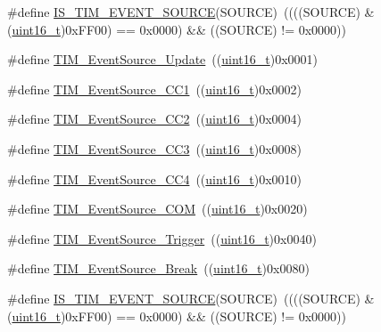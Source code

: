 \begin{DoxyCompactItemize}
\item 
\#define \hyperlink{group___t_i_m___event___source_ga4ac88c3e43c8250114ea81a6e052d58a}{I\+S\+\_\+\+T\+I\+M\+\_\+\+E\+V\+E\+N\+T\+\_\+\+S\+O\+U\+R\+CE}(S\+O\+U\+R\+CE)~((((S\+O\+U\+R\+CE) \& (\hyperlink{_p_e___types_8h_a1f1825b69244eb3ad2c7165ddc99c956}{uint16\+\_\+t})0x\+F\+F00) == 0x0000) \&\& ((\+S\+O\+U\+R\+C\+E) != 0x0000))
\item 
\#define \hyperlink{group___t_i_m___event___source_ga5bff72fbe94b1ae5a710e402c9868b23}{T\+I\+M\+\_\+\+Event\+Source\+\_\+\+Update}~((\hyperlink{_p_e___types_8h_a1f1825b69244eb3ad2c7165ddc99c956}{uint16\+\_\+t})0x0001)
\item 
\#define \hyperlink{group___t_i_m___event___source_gaa634c46d4ac521ad16e25be97b487e8a}{T\+I\+M\+\_\+\+Event\+Source\+\_\+\+C\+C1}~((\hyperlink{_p_e___types_8h_a1f1825b69244eb3ad2c7165ddc99c956}{uint16\+\_\+t})0x0002)
\item 
\#define \hyperlink{group___t_i_m___event___source_ga5e2082a09552acc9c7e9577f104ba15a}{T\+I\+M\+\_\+\+Event\+Source\+\_\+\+C\+C2}~((\hyperlink{_p_e___types_8h_a1f1825b69244eb3ad2c7165ddc99c956}{uint16\+\_\+t})0x0004)
\item 
\#define \hyperlink{group___t_i_m___event___source_gafeb8538e3b00d938e061e5051f83836b}{T\+I\+M\+\_\+\+Event\+Source\+\_\+\+C\+C3}~((\hyperlink{_p_e___types_8h_a1f1825b69244eb3ad2c7165ddc99c956}{uint16\+\_\+t})0x0008)
\item 
\#define \hyperlink{group___t_i_m___event___source_gab60e3190e6c09d2d067f2c689d614979}{T\+I\+M\+\_\+\+Event\+Source\+\_\+\+C\+C4}~((\hyperlink{_p_e___types_8h_a1f1825b69244eb3ad2c7165ddc99c956}{uint16\+\_\+t})0x0010)
\item 
\#define \hyperlink{group___t_i_m___event___source_ga4c06981037fae91786f966aa9b4b3435}{T\+I\+M\+\_\+\+Event\+Source\+\_\+\+C\+OM}~((\hyperlink{_p_e___types_8h_a1f1825b69244eb3ad2c7165ddc99c956}{uint16\+\_\+t})0x0020)
\item 
\#define \hyperlink{group___t_i_m___event___source_ga24835bf5eac25eed90069208dce22564}{T\+I\+M\+\_\+\+Event\+Source\+\_\+\+Trigger}~((\hyperlink{_p_e___types_8h_a1f1825b69244eb3ad2c7165ddc99c956}{uint16\+\_\+t})0x0040)
\item 
\#define \hyperlink{group___t_i_m___event___source_gad6f9b5366d93c73ff005273c50c9f00a}{T\+I\+M\+\_\+\+Event\+Source\+\_\+\+Break}~((\hyperlink{_p_e___types_8h_a1f1825b69244eb3ad2c7165ddc99c956}{uint16\+\_\+t})0x0080)
\item 
\#define \hyperlink{group___t_i_m___event___source_ga4ac88c3e43c8250114ea81a6e052d58a}{I\+S\+\_\+\+T\+I\+M\+\_\+\+E\+V\+E\+N\+T\+\_\+\+S\+O\+U\+R\+CE}(S\+O\+U\+R\+CE)~((((S\+O\+U\+R\+CE) \& (\hyperlink{_p_e___types_8h_a1f1825b69244eb3ad2c7165ddc99c956}{uint16\+\_\+t})0x\+F\+F00) == 0x0000) \&\& ((\+S\+O\+U\+R\+C\+E) != 0x0000))
\end{DoxyCompactItemize}


